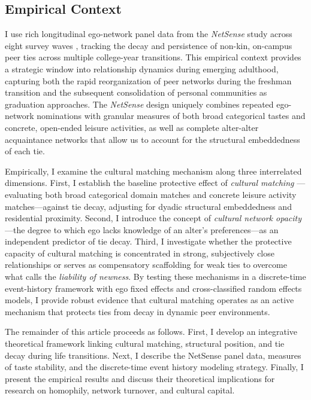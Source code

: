 \documentclass[12pt,letterpaper]{article}
\begin{document}
\subsection{Empirical Context}
I use rich longitudinal ego-network panel data from the \textit{NetSense} study across eight survey waves \citep{bahulkar2016analysis-d8b, bahulkar2017co-evolution-d04, hachen2022generators-923}, tracking the decay and persistence of non-kin, on-campus peer ties across multiple college-year transitions. This empirical context provides a strategic window into relationship dynamics during emerging adulthood, capturing both the rapid reorganization of peer networks during the freshman transition and the subsequent consolidation of personal communities as graduation approaches. The \textit{NetSense} design uniquely combines repeated ego-network nominations with granular measures of both broad categorical tastes and concrete, open-ended leisure activities, as well as complete alter-alter acquaintance networks that allow us to account for the structural embeddedness of each tie.

Empirically, I examine the cultural matching mechanism along three interrelated dimensions. First, I establish the baseline protective effect of \textit{cultural matching} --- evaluating both broad categorical domain matches and concrete leisure activity matches---against tie decay, adjusting for dyadic structural embeddedness and residential proximity. Second, I introduce the concept of \textit{cultural network opacity}---the degree to which ego lacks knowledge of an alter's preferences---as an independent predictor of tie decay. Third, I investigate whether the protective capacity of cultural matching is concentrated in strong, subjectively close relationships or serves as compensatory scaffolding for weak ties to overcome what \citep{burt2000} calls the \textit{liability of newness}. By testing these mechanisms in a discrete-time event-history framework with ego fixed effects and cross-classified random effects models, I provide robust evidence that cultural matching operates as an active mechanism that protects ties from decay in dynamic peer environments.

The remainder of this article proceeds as follows. First, I develop an integrative theoretical framework linking cultural matching, structural position, and tie decay during life transitions. Next, I describe the NetSense panel data, measures of taste stability, and the discrete-time event history modeling strategy. Finally, I present the empirical results and discuss their theoretical implications for research on homophily, network turnover, and cultural capital.
\end{document}
